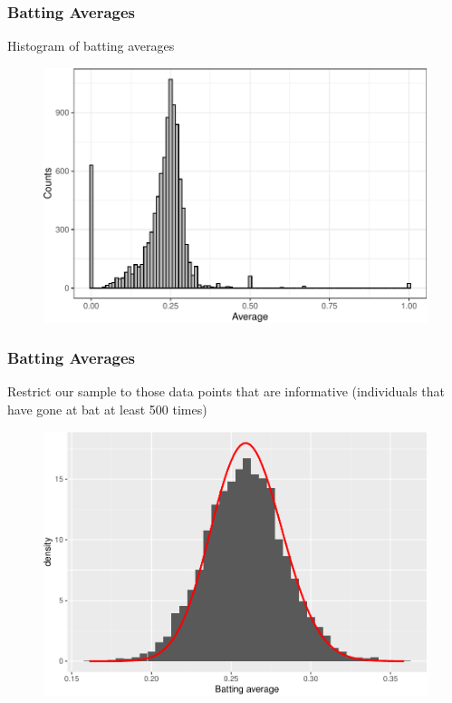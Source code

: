 \documentclass[
  shownotes,
  xcolor={svgnames},
  hyperref={colorlinks,citecolor=DarkBlue,linkcolor=DarkRed,urlcolor=DarkBlue}
  ]{beamer}
\begin{document}
\begin{frame}[fragile]
\frametitle{Batting Averages}
Histogram of batting averages

\bigskip
\bigskip
\begin{figure}[H] \centering
  \centering
  \includegraphics[scale=0.6]{figures/average_hist.pdf}
  \\
  \tiny 
\end{figure}



\end{frame}


\begin{frame}[fragile]
\frametitle{Batting Averages}
Restrict our sample to those data points that are  informative (individuals that have gone at bat at least 500 times)

\bigskip

\begin{figure}[H] \centering
  \centering
  \includegraphics[scale=0.4]{figures/av_hist_w_mle.pdf}
  \\
  \tiny 
\end{figure}


\end{frame}
\end{document}
